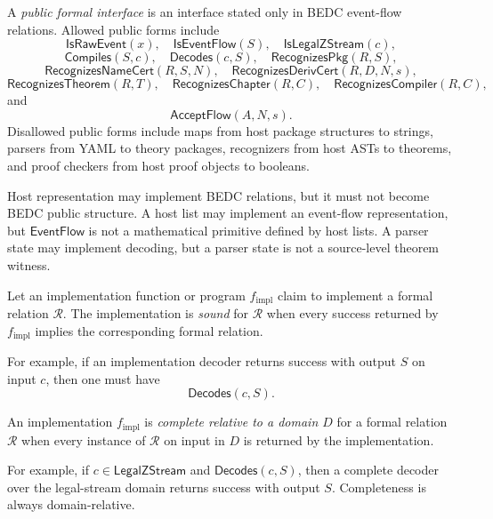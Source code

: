 \begin{definition}
\label{def:implementation-interface-public-formal-interface}
A \emph{public formal interface} is an interface stated only in BEDC event-flow relations. Allowed public forms include
$$
  \mathsf{IsRawEvent}(x),\quad
  \mathsf{IsEventFlow}(S),\quad
  \mathsf{IsLegalZStream}(c),
$$
$$
  \mathsf{Compiles}(S,c),\quad
  \mathsf{Decodes}(c,S),\quad
  \mathsf{RecognizesPkg}(R,S),
$$
$$
  \mathsf{RecognizesNameCert}(R,S,N),\quad
  \mathsf{RecognizesDerivCert}(R,D,N,s),
$$
$$
  \mathsf{RecognizesTheorem}(R,T),\quad
  \mathsf{RecognizesChapter}(R,C),\quad
  \mathsf{RecognizesCompiler}(R,C),
$$
and
$$
  \mathsf{AcceptFlow}(A,N,s).
$$
Disallowed public forms include maps from host package structures to strings, parsers from YAML to theory packages, recognizers from host ASTs to theorems, and proof checkers from host proof objects to booleans.
\end{definition}

\begin{principle}
\label{prin:implementation-interface-host-representation-not-structure}
Host representation may implement BEDC relations, but it must not become BEDC public structure. A host list may implement an event-flow representation, but $\mathsf{EventFlow}$ is not a mathematical primitive defined by host lists. A parser state may implement decoding, but a parser state is not a source-level theorem witness.
\end{principle}

\begin{definition}
\label{def:implementation-interface-implementation-soundness}
Let an implementation function or program $f_{\mathrm{impl}}$ claim to implement a formal relation $\mathcal R$. The implementation is \emph{sound} for $\mathcal R$ when every success returned by $f_{\mathrm{impl}}$ implies the corresponding formal relation.

For example, if an implementation decoder returns success with output $S$ on input $c$, then one must have
$$
  \mathsf{Decodes}(c,S).
$$
\end{definition}

\begin{definition}
\label{def:implementation-interface-implementation-completeness}
An implementation $f_{\mathrm{impl}}$ is \emph{complete relative to a domain $D$} for a formal relation $\mathcal R$ when every instance of $\mathcal R$ on input in $D$ is returned by the implementation.

For example, if $c\in\mathsf{LegalZStream}$ and $\mathsf{Decodes}(c,S)$, then a complete decoder over the legal-stream domain returns success with output $S$. Completeness is always domain-relative.
\end{definition}

